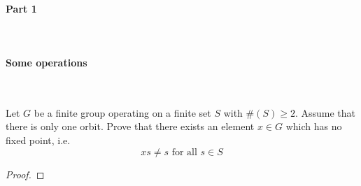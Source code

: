 

\paragraph*{Part 1}


\



\paragraph*{Some operations}

\

\begin{exercise}
    Let $G$ be a finite group operating on a finite set $S$ with $\#(S)\geq 2$. Assume that there is only one orbit. Prove that there exists an element $x\in G$ which has no fixed point, i.e. \[xs \neq s \text{ for all }s\in S\]
    
    \begin{proof}
        
    \end{proof}
\end{exercise}

